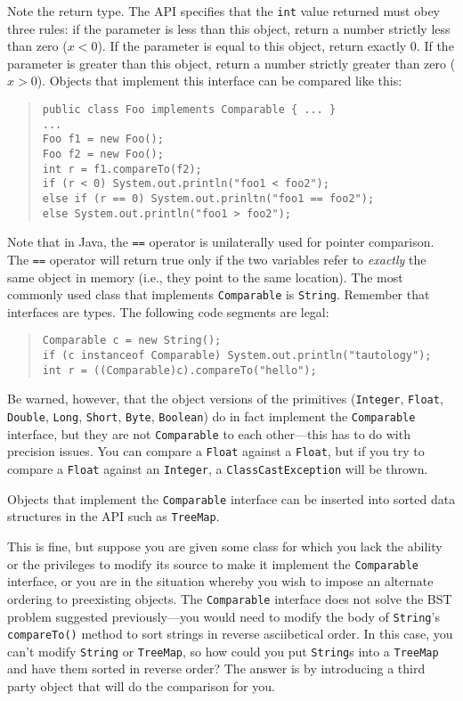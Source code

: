 \documentclass[12pt]{article}
\begin{document}
Note the return type.  The API specifies that the \texttt{int} value returned must
obey three rules: if the parameter is less than this object, return a
number strictly less than zero ($x < 0$).  If the parameter is equal to this
object, return exactly 0.  If the parameter is greater than this object,
return a number strictly greater than zero ($x > 0$).  Objects that implement
this interface can be compared like this:
\begin{quote}
\begin{verbatim}
public class Foo implements Comparable { ... }
...
Foo f1 = new Foo();
Foo f2 = new Foo();
int r = f1.compareTo(f2);
if (r < 0) System.out.println("foo1 < foo2");
else if (r == 0) System.out.prinltn("foo1 == foo2");
else System.out.println("foo1 > foo2");
\end{verbatim}
\end{quote}

Note that in Java, the \texttt{==} operator is unilaterally used for
pointer comparison.  The \texttt{==} operator will return true only if
the two variables refer to \emph{exactly} the same object in memory
(i.e., they point to the same location).  The most commonly used class
that implements \texttt{Comparable} is \texttt{String}.  Remember that
interfaces are types.  The following code segments are legal:
\begin{quote}
\begin{verbatim}
Comparable c = new String();
if (c instanceof Comparable) System.out.println("tautology");
int r = ((Comparable)c).compareTo("hello");
\end{verbatim}
\end{quote}

Be warned, however, that the object versions of the primitives
(\texttt{Integer}, \texttt{Float}, \texttt{Double}, \texttt{Long},
\texttt{Short}, \texttt{Byte}, \texttt{Boolean}) do in fact implement
the \texttt{Comparable} interface, but they are not
\texttt{Comparable} to each other---this has to do with precision
issues.  You can compare a \texttt{Float} against a \texttt{Float},
but if you try to compare a \texttt{Float} against an
\texttt{Integer}, a \texttt{ClassCastException} will be thrown.

Objects that implement the \texttt{Comparable} interface can be
inserted into sorted data structures in the API such as
\texttt{TreeMap}.

This is fine, but suppose you are given some class for which you lack
the ability or the privileges to modify its source to make it
implement the \texttt{Comparable} interface, or you are in the
situation whereby you wish to impose an alternate ordering to
preexisting objects.  The \texttt{Comparable} interface does not solve
the BST problem suggested previously---you would need to modify the
body of \texttt{String}'s \texttt{compareTo()} method to sort strings
in reverse asciibetical order.  In this case, you can't modify
\texttt{String} or \texttt{TreeMap}, so how could you put
\texttt{String}s into a \texttt{TreeMap} and have them sorted in
reverse order?  The answer is by introducing a third party object that
will do the comparison for you.
\end{document}
